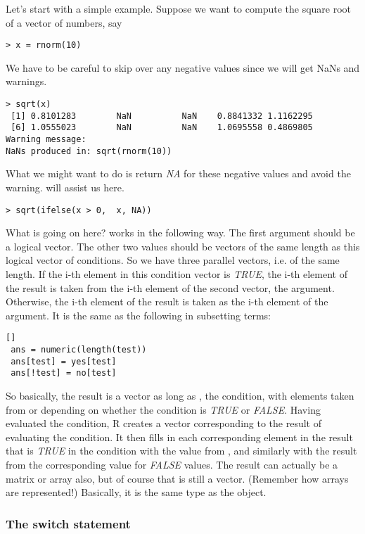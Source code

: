 Let's start with a simple example. Suppose we want to compute the
square root of a vector of numbers, say
\begin{verbatim}
> x = rnorm(10)
\end{verbatim}
We have to be careful to skip over any negative values since we will
get NaNs and warnings.
\begin{verbatim}
> sqrt(x)
 [1] 0.8101283        NaN          NaN    0.8841332 1.1162295 
 [6] 1.0555023        NaN          NaN    1.0695558 0.4869805
Warning message: 
NaNs produced in: sqrt(rnorm(10)) 
\end{verbatim}
What we might want to do is return \textit{NA} for these negative
values and avoid the warning.  will assist us here.
\begin{verbatim}
> sqrt(ifelse(x > 0,  x, NA))
\end{verbatim}
What is going on here?  works in the following
way. The first argument should be a logical vector. The other two
values should be vectors of the same length as this logical vector of
conditions. So we have three parallel vectors, i.e. of the same
length. If the i-th element in this condition vector is \textsl{TRUE},
the i-th element of the result is taken from the i-th element of the
second vector, the  argument. Otherwise, the i-th element of
the result is taken as the i-th element of the  argument. It
is the same as the following in subsetting terms:
\begin{verbatim}[]
 ans = numeric(length(test))
 ans[test] = yes[test]
 ans[!test] = no[test]
\end{verbatim}
So basically, the result is a vector as long as , the
condition, with elements taken from  or  depending
on whether the condition is \textsl{TRUE} or \textsl{FALSE}. Having
evaluated the condition, R creates a vector corresponding to the
result of evaluating the condition. It then fills in each
corresponding element in the result that is \textsl{TRUE} in the
condition with the value from , and similarly with the
result from the corresponding  value for \textsl{FALSE}
values. The result can actually be a matrix or array also, but of
course that is still a vector. (Remember how arrays are represented!)
Basically, it is the same type as the  object.

\subsubsection{The switch statement}

